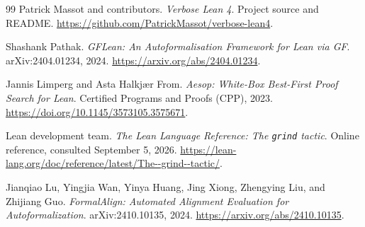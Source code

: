 \documentclass[11pt,a4paper]{article}
\theoremstyle{remark}
\begin{document}
\begin{thebibliography}{99}
Patrick Massot and contributors.
\emph{Verbose Lean 4}. Project source and README.
\url{https://github.com/PatrickMassot/verbose-lean4}.

Shashank Pathak.
\emph{GFLean: An Autoformalisation Framework for Lean via GF}.
arXiv:2404.01234, 2024.
\url{https://arxiv.org/abs/2404.01234}.

Jannis Limperg and Asta Halkj{\ae}r From.
\emph{Aesop: White-Box Best-First Proof Search for Lean}.
Certified Programs and Proofs (CPP), 2023.
\url{https://doi.org/10.1145/3573105.3575671}.

Lean development team.
\emph{The Lean Language Reference: The \texttt{grind} tactic}.
Online reference, consulted September 5, 2026.
\url{https://lean-lang.org/doc/reference/latest/The--grind--tactic/}.

Jianqiao Lu, Yingjia Wan, Yinya Huang, Jing Xiong, Zhengying Liu, and Zhijiang Guo.
\emph{FormalAlign: Automated Alignment Evaluation for Autoformalization}.
arXiv:2410.10135, 2024.
\url{https://arxiv.org/abs/2410.10135}.
\end{thebibliography}
\end{document}

